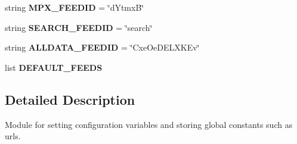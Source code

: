 \begin{DoxyCompactItemize}
\item 
\hypertarget{namespace_sbs_on_demand_1_1config_a72a1bc07f1e185bb0c2d0b047b6145bb}{
string {\bfseries \-M\-P\-X\-\_\-\-F\-E\-E\-D\-I\-D} = \char`\"{}d\-Ytmx\-B\char`\"{}}
\label{namespace_sbs_on_demand_1_1config_a72a1bc07f1e185bb0c2d0b047b6145bb}

\item 
\hypertarget{namespace_sbs_on_demand_1_1config_a8bc838c6b7c64d5b118149be13bbc3de}{
string {\bfseries \-S\-E\-A\-R\-C\-H\-\_\-\-F\-E\-E\-D\-I\-D} = \char`\"{}search\char`\"{}}
\label{namespace_sbs_on_demand_1_1config_a8bc838c6b7c64d5b118149be13bbc3de}

\item 
\hypertarget{namespace_sbs_on_demand_1_1config_a8a1d7154f2593238e8e7bd710162b6a4}{
string {\bfseries \-A\-L\-L\-D\-A\-T\-A\-\_\-\-F\-E\-E\-D\-I\-D} = \char`\"{}\-Cxe\-Oe\-D\-E\-L\-X\-K\-Ev\char`\"{}}
\label{namespace_sbs_on_demand_1_1config_a8a1d7154f2593238e8e7bd710162b6a4}

\item 
list {\bfseries \-D\-E\-F\-A\-U\-L\-T\-\_\-\-F\-E\-E\-D\-S}
\end{DoxyCompactItemize}


\subsection{\-Detailed \-Description}
\-Module for setting configuration variables and storing global constants such as urls. 

